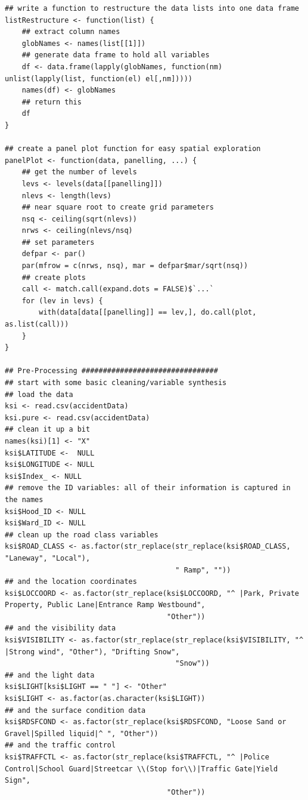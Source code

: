 \documentclass{article}
\begin{document}
\begin{lstlisting}
## write a function to restructure the data lists into one data frame
listRestructure <- function(list) {
    ## extract column names
    globNames <- names(list[[1]])
    ## generate data frame to hold all variables
    df <- data.frame(lapply(globNames, function(nm) unlist(lapply(list, function(el) el[,nm]))))
    names(df) <- globNames
    ## return this
    df
}

## create a panel plot function for easy spatial exploration
panelPlot <- function(data, panelling, ...) {
    ## get the number of levels
    levs <- levels(data[[panelling]])
    nlevs <- length(levs)
    ## near square root to create grid parameters
    nsq <- ceiling(sqrt(nlevs))
    nrws <- ceiling(nlevs/nsq)
    ## set parameters
    defpar <- par()
    par(mfrow = c(nrws, nsq), mar = defpar$mar/sqrt(nsq))
    ## create plots
    call <- match.call(expand.dots = FALSE)$`...`
    for (lev in levs) {
        with(data[data[[panelling]] == lev,], do.call(plot, as.list(call)))
    }
}

## Pre-Processing ################################
## start with some basic cleaning/variable synthesis
## load the data
ksi <- read.csv(accidentData)
ksi.pure <- read.csv(accidentData)
## clean it up a bit
names(ksi)[1] <- "X"
ksi$LATITUDE <-  NULL
ksi$LONGITUDE <- NULL
ksi$Index_ <- NULL
## remove the ID variables: all of their information is captured in the names
ksi$Hood_ID <- NULL
ksi$Ward_ID <- NULL
## clean up the road class variables
ksi$ROAD_CLASS <- as.factor(str_replace(str_replace(ksi$ROAD_CLASS, "Laneway", "Local"),
                                        " Ramp", ""))
## and the location coordinates
ksi$LOCCOORD <- as.factor(str_replace(ksi$LOCCOORD, "^ |Park, Private Property, Public Lane|Entrance Ramp Westbound",
                                      "Other"))
## and the visibility data
ksi$VISIBILITY <- as.factor(str_replace(str_replace(ksi$VISIBILITY, "^ |Strong wind", "Other"), "Drifting Snow",
                                        "Snow"))
## and the light data
ksi$LIGHT[ksi$LIGHT == " "] <- "Other"
ksi$LIGHT <- as.factor(as.character(ksi$LIGHT))
## and the surface condition data
ksi$RDSFCOND <- as.factor(str_replace(ksi$RDSFCOND, "Loose Sand or Gravel|Spilled liquid|^ ", "Other"))
## and the traffic control
ksi$TRAFFCTL <- as.factor(str_replace(ksi$TRAFFCTL, "^ |Police Control|School Guard|Streetcar \\(Stop for\\)|Traffic Gate|Yield Sign",
                                      "Other"))



\end{lstlisting}
\end{document}
